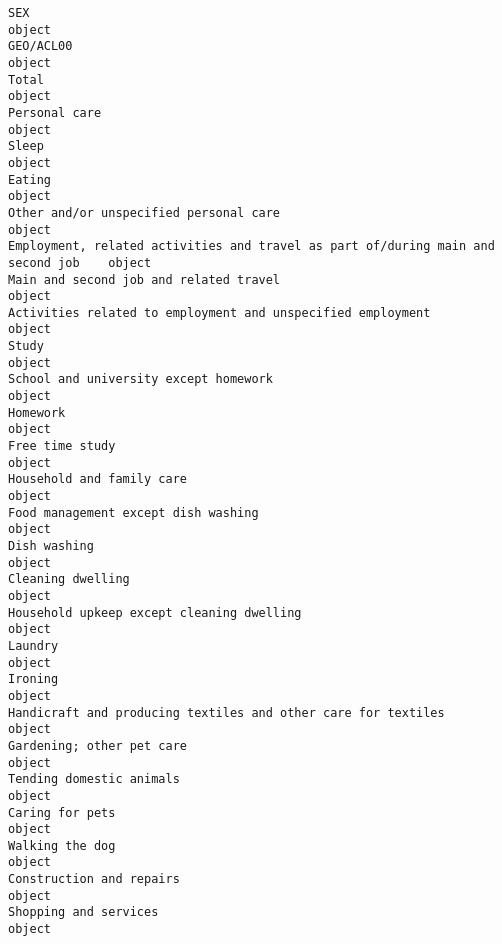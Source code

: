 \documentclass[11pt]{article}
\begin{document}
    \begin{Verbatim}[commandchars=\\\{\}]
SEX                                                                                object
GEO/ACL00                                                                          object
Total                                                                              object
Personal care                                                                      object
Sleep                                                                              object
Eating                                                                             object
Other and/or unspecified personal care                                             object
Employment, related activities and travel as part of/during main and second job    object
Main and second job and related travel                                             object
Activities related to employment and unspecified employment                        object
Study                                                                              object
School and university except homework                                              object
Homework                                                                           object
Free time study                                                                    object
Household and family care                                                          object
Food management except dish washing                                                object
Dish washing                                                                       object
Cleaning dwelling                                                                  object
Household upkeep except cleaning dwelling                                          object
Laundry                                                                            object
Ironing                                                                            object
Handicraft and producing textiles and other care for textiles                      object
Gardening; other pet care                                                          object
Tending domestic animals                                                           object
Caring for pets                                                                    object
Walking the dog                                                                    object
Construction and repairs                                                           object
Shopping and services                                                              object

\end{Verbatim}
\end{document}
